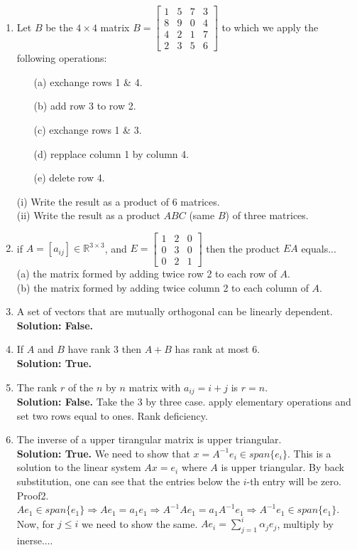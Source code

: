\documentclass[14pt]{report}
\begin{document}
\begin{enumerate}
\item Let $B$ be the $4\times4$ matrix $B=\left[\begin{array}{cccc}
  1&5&7&3\\8&9&0&4\\4&2&1&7\\2&3&5&6\end{array}\right]$ to which we apply the following operations:
        \begin{enumerate}
          \item[(a)] exchange rows 1 \& 4.
          \item[(b)] add row 3 to row 2.
          \item[(c)] exchange rows 1 \& 3.
          \item[(d)] repplace column 1 by column 4.
          \item[(e)] delete row 4.  
        \end{enumerate}
(i) Write the result as a product of 6 matrices.\\
(ii) Write the result as a product $ABC$ (same $B$) of three matrices.

\item if $A=[a_{ij}]\in\mathbb{R}^{3\times 3}$, and $E=\left[\begin{array}{ccc}
  1&2&0\\0&3&0\\0&2&1\end{array}\right]$ then the product $EA$ equals...\\
      (a) the matrix formed by adding twice row 2 to each row of $A$.\\
      (b) the matrix formed by adding twice column 2 to each column of $A$.

\item A set of vectors that are mutually orthogonal can be
  linearly dependent. \\
  \textbf{Solution: False.} 

\item If $A$ and $B$ have rank $3$ then $A+B$ has rank at most $6$.\\
  \textbf{Solution: True.} 

\item The rank $r$ of the $n$ by $n$ matrix with $a_{ij}=i+j$ is $r=n$.\\
\textbf{Solution: False.} Take the 3 by three case. apply elementary operations
and set two rows equal to ones. Rank deficiency. 

\item The inverse of a upper tirangular matrix is upper triangular.\\
  \textbf{Solution: True.} We need to show that $x=A^{-1}e_i\in
  span\{e_i\}$. This is a solution to the linear system
  $Ax=e_i$ where $A$ is upper triangular. By back
  substitution, one can see that the entries below the $i$-th
  entry will be zero. Proof2. $Ae_1\in span\{e_1\}\Rightarrow
  Ae_1=a_1e_1\Rightarrow A^{-1}Ae_1=a_1A^{-1}e_1\Rightarrow A^{-1}e_1\in
  span\{e_1\}$. Now, for $j\leq i$ we need to show the same.
  $Ae_i=\sum_{j=1}^{i}\alpha_je_j$, multiply by inerse....


\end{enumerate}
\end{document}
